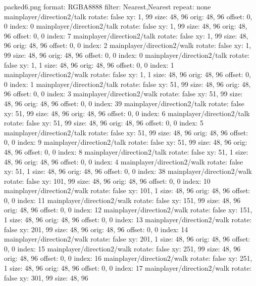 packed6.png
format: RGBA8888
filter: Nearest,Nearest
repeat: none
mainplayer/direction2/talk
  rotate: false
  xy: 1, 99
  size: 48, 96
  orig: 48, 96
  offset: 0, 0
  index: 0
mainplayer/direction2/talk
  rotate: false
  xy: 1, 99
  size: 48, 96
  orig: 48, 96
  offset: 0, 0
  index: 7
mainplayer/direction2/talk
  rotate: false
  xy: 1, 99
  size: 48, 96
  orig: 48, 96
  offset: 0, 0
  index: 2
mainplayer/direction2/walk
  rotate: false
  xy: 1, 99
  size: 48, 96
  orig: 48, 96
  offset: 0, 0
  index: 0
mainplayer/direction2/talk
  rotate: false
  xy: 1, 1
  size: 48, 96
  orig: 48, 96
  offset: 0, 0
  index: 1
mainplayer/direction2/walk
  rotate: false
  xy: 1, 1
  size: 48, 96
  orig: 48, 96
  offset: 0, 0
  index: 1
mainplayer/direction2/talk
  rotate: false
  xy: 51, 99
  size: 48, 96
  orig: 48, 96
  offset: 0, 0
  index: 3
mainplayer/direction2/walk
  rotate: false
  xy: 51, 99
  size: 48, 96
  orig: 48, 96
  offset: 0, 0
  index: 39
mainplayer/direction2/talk
  rotate: false
  xy: 51, 99
  size: 48, 96
  orig: 48, 96
  offset: 0, 0
  index: 6
mainplayer/direction2/talk
  rotate: false
  xy: 51, 99
  size: 48, 96
  orig: 48, 96
  offset: 0, 0
  index: 5
mainplayer/direction2/talk
  rotate: false
  xy: 51, 99
  size: 48, 96
  orig: 48, 96
  offset: 0, 0
  index: 9
mainplayer/direction2/talk
  rotate: false
  xy: 51, 99
  size: 48, 96
  orig: 48, 96
  offset: 0, 0
  index: 8
mainplayer/direction2/talk
  rotate: false
  xy: 51, 1
  size: 48, 96
  orig: 48, 96
  offset: 0, 0
  index: 4
mainplayer/direction2/walk
  rotate: false
  xy: 51, 1
  size: 48, 96
  orig: 48, 96
  offset: 0, 0
  index: 38
mainplayer/direction2/walk
  rotate: false
  xy: 101, 99
  size: 48, 96
  orig: 48, 96
  offset: 0, 0
  index: 10
mainplayer/direction2/walk
  rotate: false
  xy: 101, 1
  size: 48, 96
  orig: 48, 96
  offset: 0, 0
  index: 11
mainplayer/direction2/walk
  rotate: false
  xy: 151, 99
  size: 48, 96
  orig: 48, 96
  offset: 0, 0
  index: 12
mainplayer/direction2/walk
  rotate: false
  xy: 151, 1
  size: 48, 96
  orig: 48, 96
  offset: 0, 0
  index: 13
mainplayer/direction2/walk
  rotate: false
  xy: 201, 99
  size: 48, 96
  orig: 48, 96
  offset: 0, 0
  index: 14
mainplayer/direction2/walk
  rotate: false
  xy: 201, 1
  size: 48, 96
  orig: 48, 96
  offset: 0, 0
  index: 15
mainplayer/direction2/walk
  rotate: false
  xy: 251, 99
  size: 48, 96
  orig: 48, 96
  offset: 0, 0
  index: 16
mainplayer/direction2/walk
  rotate: false
  xy: 251, 1
  size: 48, 96
  orig: 48, 96
  offset: 0, 0
  index: 17
mainplayer/direction2/walk
  rotate: false
  xy: 301, 99
  size: 48, 96
